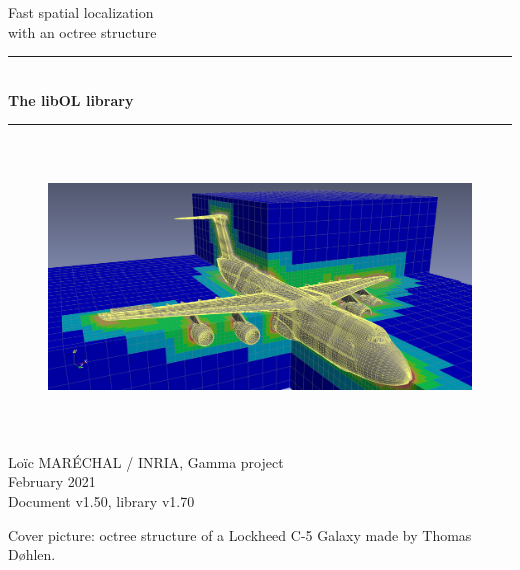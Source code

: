 \documentclass[a4paper,12pt]{article}
\newcommand{\HRule}{\rule{\linewidth}{1mm}}
\begin{document}
%
%

\begin{titlepage}

\begin{center}
\huge Fast spatial localization \\ with an octree structure
\HRule \\
\medskip
{\Huge \bfseries The libOL library} \\
\HRule
\end{center}


\begin{figure}[htbp]
\begin{center}
\includegraphics[height=7.8cm]{octree_mesh.png}
\end{center}
\end{figure}


\begin{flushright}
\Large Lo\"ic MAR\'ECHAL / INRIA, Gamma project\\
\Large February 2021 \\
\normalsize Document v1.50, library v1.70
\end{flushright}

\end{titlepage}

\clearpage

\setcounter{tocdepth}{2}
\renewcommand*\contentsname{Table of contents}
\tableofcontents
\vfill

\footnotesize{Cover picture: octree structure of a Lockheed C-5 Galaxy made by Thomas Døhlen.}
\normalsize

\clearpage
\end{document}
